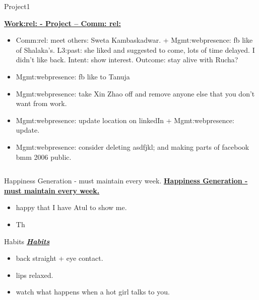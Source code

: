 \begin{columns}
\begin{column}{0.333\columnwidth}
\begin{block}{Project1}

\underline{\bf Work:rel: -  Project – Comm: rel:} 
\begin{itemize} 
\item \tiny Comm:rel: meet others:  Sweta Kambaskadwar. + Mgmt:webpresence: fb
like of Shalaka’s. L3:past: she liked and suggested to come, lots of
time delayed. I didn’t like back.  Intent: show interest. Outcome:
stay alive with Rucha?
\item \tiny Mgmt:webpresence: fb like to Tanuja
\item \tiny Mgmt:webpresence: take Xin Zhao off and remove anyone else that you
don’t want from work.
\item \tiny Mgmt:webpresence: update location on linkedIn +  Mgmt:webpresence: update.
\item \tiny Mgmt:webpresence: consider deleting asdfjkl;  and making parts of facebook bmm 2006 public. 
\end{itemize}

\end{block}
\ifdefined\POSTER
  \begin{columns}
    \begin{column}{0.22\linewidth}
      \begin{block}{Happiness Generation - must maintain every week.} 
\else
 \underline{\bf Happiness Generation - must maintain every week.}
\fi
        \begin{itemize}
          \tiny \item \tiny happy that I have Atul to show me.  
          \item \tiny Th
        \end{itemize}
\ifdefined\POSTER
      \end{block}
\fi

\ifdefined\POSTER
    \begin{block}{Habits}
\else
 \underline{\bf \it Habits} 
\fi 
      \begin{itemize} 
        \tiny \item \tiny back straight + eye contact. 
      \item \tiny lips relaxed. 
      \item \tiny watch what happens when a hot girl talks to you. 
      \end{itemize}


\end{block}
\end{column}
\end{columns}
\end{column}
\end{columns}
